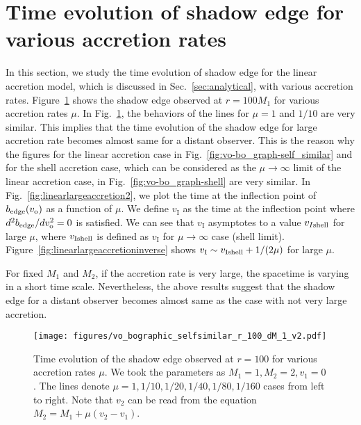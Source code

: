 \documentclass[prd,showpacs,preprintnumbers,groupedaddress,superscriptaddress,nofootinbib,11pt]{revtex4-1} %
\theoremstyle{newplain}
\begin{document}
\afterpage{\clearpage}
\newpage

\section{Time evolution of shadow edge for various accretion rates}
\label{sec:linearlargeaccretion}

In this section, we study 
the time evolution of shadow edge for the linear accretion model, which is discussed in Sec.~\ref{sec:analytical}, with various accretion rates.
Figure~\ref{fig:linearlargeaccretion1} shows 
the shadow edge observed at $r = 100 M_1$ for various accretion rates $\mu$.
In Fig.~\ref{fig:linearlargeaccretion1}, 
the behaviors of the lines for $\mu = 1$ and $1/10$ are very similar.
This implies that the time evolution of the shadow edge for large accretion rate becomes almost same for a distant observer.
This is the reason why the figures for the linear accretion case in Fig.~\ref{fig:vo-bo_graph-self_similar}
and  for the shell accretion case, which can be considered as the $\mu \to \infty$ limit of the linear accretion case, in Fig.~\ref {fig:vo-bo_graph-shell} are very similar.
In Fig.~\ref{fig:linearlargeaccretion2},
we plot the time at 
the inflection point of $b_{\rm edge}(v_\text{o})$ as a function of $\mu$.
We define $v_\text{I}$ as the time at the inflection point where $d^2b_{\rm edge}/dv_\text{o}^2 = 0$ is satisfied.
We can see that $v_\text{I}$ asymptotes to a value $v_{I{\rm shell}}$ for large $\mu$, where 
$v_{\text{I} {\rm shell}}$ is defined as $v_\text{I}$ for $\mu \to \infty$ case (shell limit).
Figure~\ref{fig:linearlargeaccretioninverse} shows 
$v_\text{I} \sim v_{\text{I} {\rm shell}} + 1/(2 \mu)$ for large $\mu$.


For fixed $M_1$ and $M_2$, if the accretion rate is very large, the spacetime is varying in a short time scale.
Nevertheless, the above results suggest that the shadow edge for a distant observer becomes almost same as the case with not very large accretion.


\begin{figure}[h]
\texttt{[image: figures/vo\_bographic\_selfsimilar\_r\_100\_dM\_1\_v2.pdf]}
\caption{\label{fig:linearlargeaccretion1} 
Time evolution of the shadow edge observed at $r = 100$ for various accretion rates $\mu$.
We took the parameters as $M_1 = 1, M_2 = 2, v_1 = 0$.
The lines denote $\mu = 1, 1/10, 1/20, 1/40, 1/80, 1/160$ cases from left to right.
Note that $v_2$ can be read from the equation $M_2 = M_1 + \mu(v_2 - v_1)$.
}
\end{figure}
\end{document}
